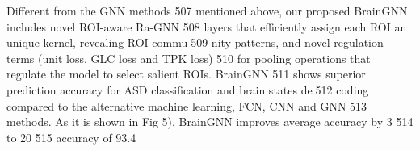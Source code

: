 Different from the GNN methods
507 mentioned above, our proposed BrainGNN includes novel ROI-aware Ra-GNN
508 layers that efficiently assign each ROI an unique kernel, revealing ROI commu509 nity patterns, and novel regulation terms (unit loss, GLC loss and TPK loss)
510 for pooling operations that regulate the model to select salient ROIs. BrainGNN
511 shows superior prediction accuracy for ASD classification and brain states de512 coding compared to the alternative machine learning, FCN, CNN and GNN
513 methods. As it is shown in Fig 5), BrainGNN improves average accuracy by 3%
514 to 20%
515 accuracy of 93.4%
\cite{Li2020}